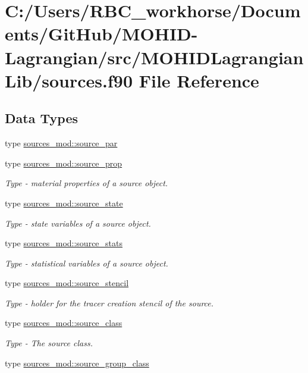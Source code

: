 \hypertarget{sources_8f90}{}\section{C\+:/\+Users/\+R\+B\+C\+\_\+workhorse/\+Documents/\+Git\+Hub/\+M\+O\+H\+I\+D-\/\+Lagrangian/src/\+M\+O\+H\+I\+D\+Lagrangian\+Lib/sources.f90 File Reference}
\label{sources_8f90}
\subsection*{Data Types}
\begin{DoxyCompactItemize}
\item 
type \mbox{\hyperlink{structsources__mod_1_1source__par}{sources\+\_\+mod\+::source\+\_\+par}}
\item 
type \mbox{\hyperlink{structsources__mod_1_1source__prop}{sources\+\_\+mod\+::source\+\_\+prop}}
\begin{DoxyCompactList}\small\item\em Type -\/ material properties of a source object. \end{DoxyCompactList}\item 
type \mbox{\hyperlink{structsources__mod_1_1source__state}{sources\+\_\+mod\+::source\+\_\+state}}
\begin{DoxyCompactList}\small\item\em Type -\/ state variables of a source object. \end{DoxyCompactList}\item 
type \mbox{\hyperlink{structsources__mod_1_1source__stats}{sources\+\_\+mod\+::source\+\_\+stats}}
\begin{DoxyCompactList}\small\item\em Type -\/ statistical variables of a source object. \end{DoxyCompactList}\item 
type \mbox{\hyperlink{structsources__mod_1_1source__stencil}{sources\+\_\+mod\+::source\+\_\+stencil}}
\begin{DoxyCompactList}\small\item\em Type -\/ holder for the tracer creation stencil of the source. \end{DoxyCompactList}\item 
type \mbox{\hyperlink{structsources__mod_1_1source__class}{sources\+\_\+mod\+::source\+\_\+class}}
\begin{DoxyCompactList}\small\item\em Type -\/ The source class. \end{DoxyCompactList}\item 
type \mbox{\hyperlink{structsources__mod_1_1source__group__class}{sources\+\_\+mod\+::source\+\_\+group\+\_\+class}}
\end{DoxyCompactItemize}
